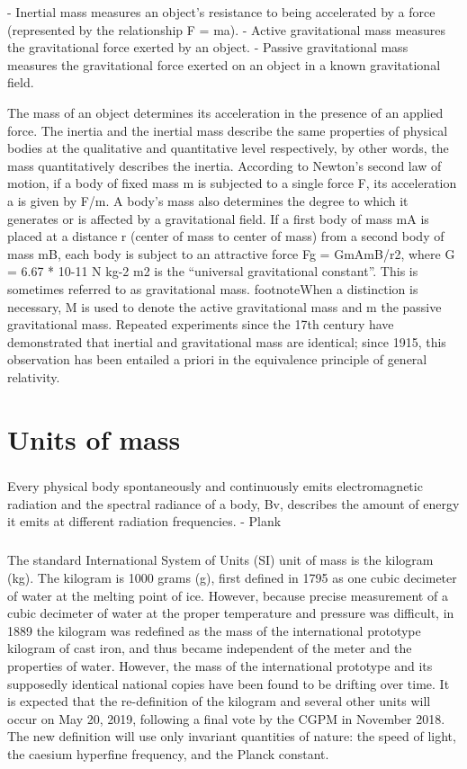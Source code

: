 \documentclass{book}
\begin{document}
	- Inertial mass measures an object's resistance to being accelerated by a force (represented by the relationship F = ma).
	- Active gravitational mass measures the gravitational force exerted by an object.
	- Passive gravitational mass measures the gravitational force exerted on an object in a known gravitational field.
	
	
	The mass of an object determines its acceleration in the presence of an applied force. The inertia and the inertial mass describe the same properties of physical bodies at the qualitative and quantitative level respectively, by other words, the mass quantitatively describes the inertia. According to Newton's second law of motion, if a body of fixed mass m is subjected to a single force F, its acceleration a is given by F/m. A body's mass also determines the degree to which it generates or is affected by a gravitational field. If a first body of mass mA is placed at a distance r (center of mass to center of mass) from a second body of mass mB, each body is subject to an attractive force Fg = GmAmB/r2, where G = 6.67 * 10{-11} N kg{-2} m2 is the ``universal gravitational constant''. This is sometimes referred to as gravitational mass.  footnote{When a distinction is necessary, M is used to denote the active gravitational mass and m the passive gravitational mass.} Repeated experiments since the 17th century have demonstrated that inertial and gravitational mass are identical; since 1915, this observation has been entailed a priori in the equivalence principle of general relativity.
	
	\chapter{Units of mass}
	\paragraph{}
	Every physical body spontaneously and continuously emits electromagnetic radiation and the spectral radiance of a body, Bv, describes the amount of energy it emits at different radiation frequencies. - Plank
	
	\paragraph{}
	The standard International System of Units (SI) unit of mass is the kilogram (kg). The kilogram is 1000 grams (g), first defined in 1795 as one cubic decimeter of water at the melting point of ice. However, because precise measurement of a cubic decimeter of water at the proper temperature and pressure was difficult, in 1889 the kilogram was redefined as the mass of the international prototype kilogram of cast iron, and thus became independent of the meter and the properties of water. However, the mass of the international prototype and its supposedly identical national copies have been found to be drifting over time. It is expected that the re-definition of the kilogram and several other units will occur on May 20, 2019, following a final vote by the CGPM in November 2018. The new definition will use only invariant quantities of nature: the speed of light, the caesium hyperfine frequency, and the Planck constant.
	
\end{document}
